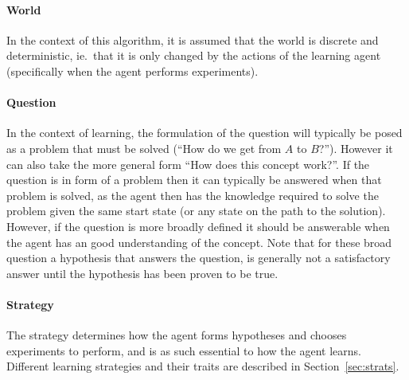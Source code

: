 \documentclass[\master/Master.tex]{subfiles}
\begin{document}
\paragraph*{World}
In the context of this algorithm, it is assumed that the world is discrete and deterministic, ie.\ that it is only changed by the actions of the learning agent (specifically when the agent performs experiments).

\paragraph*{Question}

In the context of learning, the formulation of the question will typically be posed as a problem that must be solved (``How do we get from $A$ to $B$?'').
However it can also take the more general form ``How does this concept work?''.
If the question is in form of a problem then it can typically be answered when that problem is solved, 
as the agent then has the knowledge required to solve the problem given the same start state (or any state on the path to the solution). 
However, if the question is more broadly defined it should be answerable when the agent has an good understanding of the concept. 
Note that for these broad question a hypothesis that answers the question, is generally not a satisfactory answer until the hypothesis has been proven to be true.


\paragraph*{Strategy}
The strategy determines how the agent forms hypotheses and chooses experiments to perform, and is as such essential to how the agent learns. Different learning strategies and their traits are described in Section~\ref{sec:strats}.
\end{document}
